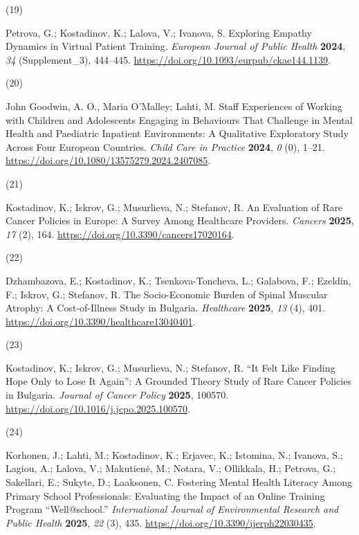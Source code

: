 \documentclass[
  12pt,
  letterpaper,
  DIV=11,
  numbers=noendperiod]{scrartcl}
\newlength{\cslhangindent}
\newlength{\csllabelwidth}
\newenvironment{CSLReferences}[2] %
 {\begin{list}{}{%
  \setlength{\itemindent}{0pt}
  \setlength{\leftmargin}{0pt}
  \setlength{\parsep}{0pt}
  \ifodd #1
   \setlength{\leftmargin}{\cslhangindent}
   \setlength{\itemindent}{-1\cslhangindent}
  \fi
  \setlength{\itemsep}{#2\baselineskip}}}
 {\end{list}}
\newcommand{\CSLLeftMargin}[1]{\parbox[t]{\csllabelwidth}{\strut#1\strut}}
\newcommand{\CSLRightInline}[1]{\parbox[t]{\linewidth - \csllabelwidth}{\strut#1\strut}}
\begin{document}
\begin{CSLReferences}{0}{0}
\CSLLeftMargin{(19) }%
\CSLRightInline{Petrova, G.; Kostadinov, K.; Lalova, V.; Ivanova, S.
Exploring Empathy Dynamics in Virtual Patient Training. \emph{European
Journal of Public Health} \textbf{2024}, \emph{34} (Supplement\_3),
444--445. \url{https://doi.org/10.1093/eurpub/ckae144.1139}.}

\CSLLeftMargin{(20) }%
\CSLRightInline{John Goodwin, A. O., Maria O'Malley; Lahti, M. Staff
Experiences of Working with Children and Adolescents Engaging in
Behaviours That Challenge in Mental Health and Paediatric Inpatient
Environments: A Qualitative Exploratory Study Across Four European
Countries. \emph{Child Care in Practice} \textbf{2024}, \emph{0} (0),
1--21. \url{https://doi.org/10.1080/13575279.2024.2407085}.}

\CSLLeftMargin{(21) }%
\CSLRightInline{Kostadinov, K.; Iskrov, G.; Musurlieva, N.; Stefanov, R.
An Evaluation of Rare Cancer Policies in Europe: A Survey Among
Healthcare Providers. \emph{Cancers} \textbf{2025}, \emph{17} (2), 164.
\url{https://doi.org/10.3390/cancers17020164}.}

\CSLLeftMargin{(22) }%
\CSLRightInline{Dzhambazova, E.; Kostadinov, K.; Tsenkova-Toncheva, L.;
Galabova, F.; Ezeldin, F.; Iskrov, G.; Stefanov, R. The Socio-Economic
Burden of Spinal Muscular Atrophy: A Cost-of-Illness Study in Bulgaria.
\emph{Healthcare} \textbf{2025}, \emph{13} (4), 401.
\url{https://doi.org/10.3390/healthcare13040401}.}

\CSLLeftMargin{(23) }%
\CSLRightInline{Kostadinov, K.; Iskrov, G.; Musurlieva, N.; Stefanov, R.
{``It Felt Like Finding Hope Only to Lose It Again''}: A Grounded Theory
Study of Rare Cancer Policies in Bulgaria. \emph{Journal of Cancer
Policy} \textbf{2025}, 100570.
\url{https://doi.org/10.1016/j.jcpo.2025.100570}.}

\CSLLeftMargin{(24) }%
\CSLRightInline{Korhonen, J.; Lahti, M.; Kostadinov, K.; Erjavec, K.;
Istomina, N.; Ivanova, S.; Lagiou, A.; Lalova, V.; Makutienė, M.;
Notara, V.; Ollikkala, H.; Petrova, G.; Sakellari, E.; Sukyte, D.;
Laaksonen, C. Fostering Mental Health Literacy Among Primary School
Professionals: Evaluating the Impact of an Online Training Program
{``Well@school.''} \emph{International Journal of Environmental Research
and Public Health} \textbf{2025}, \emph{22} (3), 435.
\url{https://doi.org/10.3390/ijerph22030435}.}

\end{CSLReferences}
\end{document}
